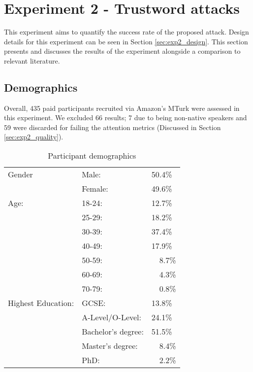 

\newpage

\section{Experiment 2 - Trustword attacks}
\label{sec:exp2}
This experiment aims to quantify the success rate of the proposed attack. Design details for this experiment can be seen in Section \ref{sec:exp2_design}. This section presents and discusses the results of the experiment alongside a comparison to relevant literature.

\subsection*{Demographics}
Overall, 435 paid participants recruited via Amazon's MTurk were assessed in this experiment. We excluded 66 results; 7 due to being non-native speakers and 59 were discarded for failing the attention metrics (Discussed in Section \ref{sec:exp2_quality}).

\begin{table}[h]
    \centering
    \begin{tabular}{|l|ll|}
        \hline
        Gender & Male: & 50.4\% \\
               & Female: & 49.6\% \\
        \hline
        Age:   & 18-24: & 12.7\% \\ 
               & 25-29: & 18.2\% \\ 
               & 30-39: & 37.4\% \\ 
               & 40-49: & 17.9\% \\ 
               & 50-59: & ~~8.7\% \\ 
               & 60-69: & ~~4.3\% \\ 
               & 70-79: & ~~0.8\% \\ 

        \hline
        Highest Education:  
        & GCSE:                 & 13.8\%  \\
        & A-Level/O-Level:      & 24.1\% \\
        & Bachelor's degree:    & 51.5\% \\
        & Master's degree:      & ~~8.4\% \\ 
        & PhD:                  & ~~2.2\% \\
        \hline

    \end{tabular}
    \caption{Participant demographics}
    \label{tab:exp2_demo}
\end{table}

